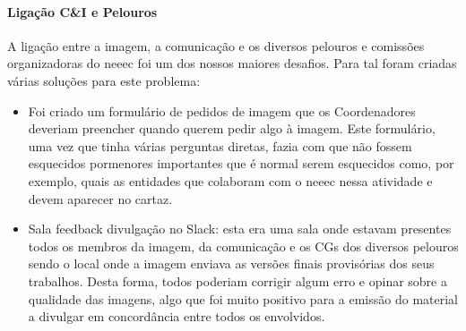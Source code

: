
\paragraph{Ligação C\&I e Pelouros}

A ligação entre a imagem, a comunicação e os diversos pelouros e comissões organizadoras do \acrshort{neeec} foi um dos nossos maiores desafios. Para tal foram criadas várias soluções para este problema:
\begin{itemize}
\item Foi criado um formulário de pedidos de imagem que os Coordenadores deveriam preencher quando querem pedir algo à imagem. Este formulário, uma vez que tinha várias perguntas diretas, fazia com que não fossem esquecidos pormenores importantes que é normal serem esquecidos como, por exemplo, quais as entidades que colaboram com o \acrshort{neeec} nessa atividade e devem aparecer no cartaz.
\item Sala feedback divulgação no Slack: esta era uma sala onde estavam presentes todos os membros da imagem, da comunicação e os CGs dos diversos pelouros sendo o local onde a imagem enviava as versões finais provisórias dos seus trabalhos. Desta forma, todos poderiam corrigir algum erro e opinar sobre a qualidade das imagens, algo que foi muito positivo para a emissão do material a divulgar em concordância entre todos os envolvidos.
\end{itemize}